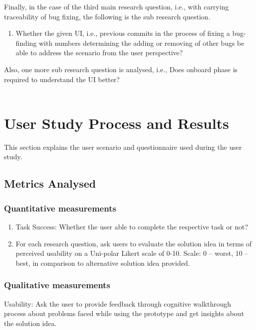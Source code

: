 Finally, in the case of the third main research question, i.e., with carrying traceability of bug fixing, the following is the sub research question. \\

\begin{enumerate}
	\item Whether the given UI, i.e., previous commits in the process of fixing a bug-finding with numbers determining the adding or removing of other bugs be able to address the scenario from the user perspective?
\end{enumerate} 

Also, one more sub research question is analysed, i.e., Does onboard phase is required to understand the UI better? \\ \\

\section{User Study Process and Results}

This section explains the user scenario and questionnaire used during the user study.

\subsection{Metrics Analysed}

\subsubsection{Quantitative measurements}  

\begin{enumerate}
\item Task Success: Whether the user able to complete the respective task or not?
\item For each research question, ask users to evaluate the solution idea in terms of perceived usability on a Uni-polar Likert scale of 0-10. Scale: 0 – worst, 10 – best, in comparison to alternative solution idea provided.
\end{enumerate} 

\subsubsection{Qualitative measurements} 

Usability: Ask the user to provide feedback through cognitive walkthrough process about problems faced while using the prototype and get insights about the solution idea. \\

